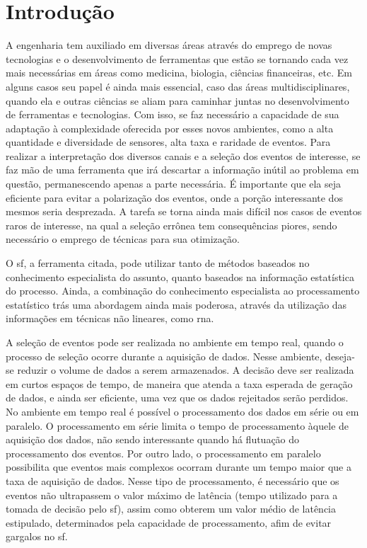 \chapter{Introdução}
\label{cap:intro}
\glsresetall


A engenharia tem auxiliado em diversas áreas através do emprego de
novas tecnologias e o desenvolvimento de ferramentas que estão se tornando cada
vez mais necessárias em áreas como medicina, biologia, ciências financeiras, etc. Em 
alguns casos seu papel é ainda mais essencial, caso das áreas
multidisciplinares, quando ela e outras ciências se aliam para caminhar juntas no
desenvolvimento de ferramentas e tecnologias. Com isso, se faz necessário a
capacidade de sua adaptação à complexidade oferecida por esses novos ambientes, 
como a alta quantidade e diversidade de sensores, alta taxa e raridade de
eventos. Para realizar a interpretação dos diversos canais e a seleção dos eventos 
de interesse, se faz mão de uma ferramenta que irá descartar a 
informação inútil ao problema em questão, permanescendo apenas
a parte necessária. É importante que ela seja eficiente para evitar a polarização
dos eventos, onde a porção interessante dos mesmos seria desprezada.
A tarefa se torna ainda mais difícil nos casos de 
eventos raros de interesse, na qual a seleção errônea tem consequências piores,
sendo necessário o emprego de técnicas para sua otimização. 

O \glsdesc{sf}, a ferramenta citada, pode utilizar tanto de métodos baseados no conhecimento 
especialista do assunto, quanto baseados na informação estatística do processo. Ainda, 
a combinação do conhecimento especialista ao processamento estatístico trás uma abordagem ainda 
mais poderosa, através da utilização das informações em técnicas não lineares, 
como \glsdesc{rna}.

A seleção de eventos pode ser realizada no ambiente em tempo real,
quando o processo de seleção ocorre durante a aquisição de dados. Nesse
ambiente, deseja-se reduzir o volume de dados a serem armazenados. A decisão deve ser realizada 
em curtos espaços de tempo, de maneira que atenda a taxa esperada de geração de
dados, e ainda ser eficiente, uma vez que os dados rejeitados serão perdidos. 
No ambiente em tempo real é possível o processamento dos dados em série
ou em paralelo. O processamento em série limita o tempo de processamento àquele
de aquisição dos dados, não sendo interessante quando há flutuação do
processamento dos eventos. Por outro lado, o processamento em
paralelo possibilita que eventos mais complexos ocorram durante um tempo maior
que a taxa de aquisição de dados. Nesse tipo de processamento, é necessário que
os eventos não ultrapassem o valor máximo de latência (tempo utilizado
para a tomada de decisão pelo \glsdesc{sf}), assim como obterem um valor 
médio de latência estipulado, determinados pela capacidade de processamento,
afim de evitar gargalos no \glsdesc{sf}.

